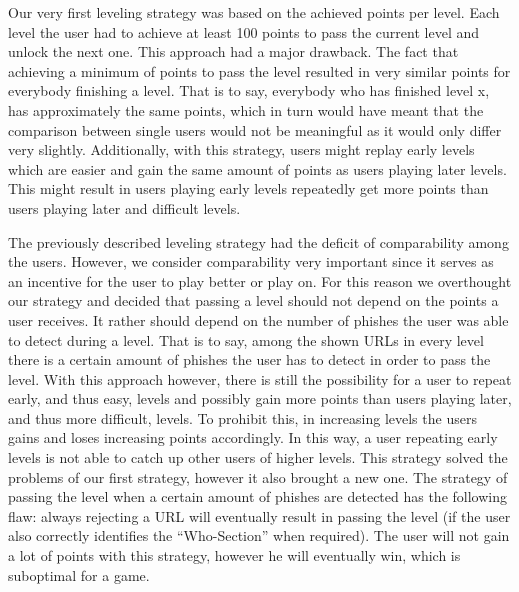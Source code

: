 \begin{description}[leftmargin=0cm]
	\item[Leveling Based on Achieved Points] Our very first leveling strategy was based on the achieved points per level. Each level the user had to achieve at least 100 points to pass the current level and unlock the next one. This approach had a major drawback. The fact that achieving a minimum of points to pass the level resulted in very similar points for everybody finishing a level. That is to say, everybody who has finished level x, has approximately the same points, which in turn would have meant that the comparison between single users would not be meaningful as it would only differ very slightly. Additionally, with this strategy, users might replay early levels which are easier and gain the same amount of points as users playing later levels. This might result in users playing early levels repeatedly get more points than users playing later and difficult levels.
	\item[Leveling Based on Detected Phishes] The previously described leveling strategy had the deficit of comparability among the users. However, we consider comparability very important  since it serves as an incentive for the user to play better or play on. For this reason we overthought our strategy and decided that passing a level should not depend on the points a user receives. It rather should depend on the number of phishes the user was able to detect during a level. That is to say, among the shown URLs in every level there is a certain amount of phishes the user has to detect in order to pass the level. With this approach however, there is still the possibility for a user to repeat early, and thus easy, levels and possibly gain more points than users playing later, and thus more difficult, levels. To prohibit this, in increasing levels the users gains and loses increasing points accordingly. In this way, a user repeating early levels is not able to catch up other users of higher levels. This strategy solved the problems of our first strategy, however it also brought a new one. The strategy of passing the level when a certain amount of phishes are detected has the following flaw: always rejecting a URL will eventually result in passing the level (if the user also correctly identifies the ``Who-Section'' when required). The user will not gain a lot of points with this strategy, however he will eventually win, which is suboptimal for a game.  

\end{description}

